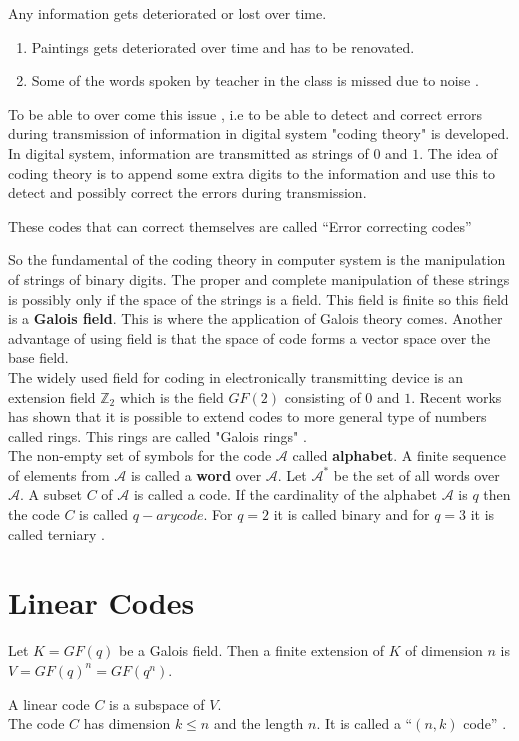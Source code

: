 Any information gets deteriorated or lost over time.

\begin{enumerate}
\item Paintings gets deteriorated over time and has to be renovated.
\item Some of the words spoken by teacher in the class is missed due to noise \cite{coding}.
\end{enumerate}

To be able to over come this issue , i.e to be able to detect and correct errors during transmission of information in digital system "coding theory" is developed.
In digital system, information are transmitted as strings of \(0\) and \(1\). The idea of coding theory is to append some extra digits to the information and use this to detect and possibly correct the errors during transmission.
\begin{definition} \cite{coding}
  These codes that can correct themselves are called ``Error correcting codes''
\end{definition}

So the fundamental of the coding theory in computer system is the manipulation of strings of binary digits. The proper and complete manipulation of these strings is possibly only if the space of the strings is a field. This field is finite so this field is a \textbf{Galois field}. This is where the application of Galois theory comes.
Another advantage of using field is that the space of code forms a vector space over the base field. \\
The widely used field for coding in electronically transmitting device is an extension field \({\mathbb{Z}}_2\) which is the field \(GF(2)\) consisting of \(0\) and \(1\). Recent works has shown that it is possible to extend codes to more general type of numbers called rings. This rings are called "Galois rings" \cite{error_correct}.\\

The non-empty set of symbols for the code \(\mathcal{A}\) called \textbf{alphabet}. A finite sequence of elements from \(\mathcal{A}\) is called a \textbf{word} over \(\mathcal{A}\). Let \(\mathcal{A}^*\) be the set of all words over \(\mathcal{A}\). A subset \(C\) of \(\mathcal{A}\) is called a code.
If the cardinality of the alphabet \(\mathcal{A}\) is \(q\) then the code \(C\) is called \(q-ary code\). For \(q=2\) it is called binary and for \(q=3\) it is called terniary \cite{error_correct}.

\section{Linear Codes}
Let \(K=GF(q)\) be a Galois field. Then a finite extension of \(K\) of dimension \(n\) is \(V=GF(q)^n=GF(q^n)\).
\begin{definition} \cite{coding}
  A linear code \(C\) is a subspace of \(V\). \\
  The code \(C\) has dimension \(k \leq n\) and the length \(n\). It is called a ``\((n,k)\) code'' \cite{error_correct}.
\end{definition}

